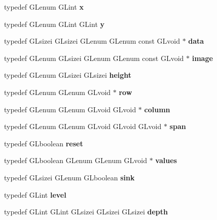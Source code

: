 \begin{DoxyCompactItemize}
\item 
typedef G\+Lenum G\+Lint {\bfseries x}\label{_s_d_l__opengl_8h_ae8f024308aaf3cca3d48055ebb11f6ec}

\item 
typedef G\+Lenum G\+Lint G\+Lint {\bfseries y}\label{_s_d_l__opengl_8h_a6b933de812613e6b69cf9a98aacc9916}

\item 
typedef G\+Lsizei G\+Lsizei G\+Lenum G\+Lenum const G\+Lvoid $\ast$ {\bfseries data}\label{_s_d_l__opengl_8h_a89ce72163394e6aef63b551a8806e93f}

\item 
typedef G\+Lenum G\+Lsizei G\+Lenum G\+Lenum const G\+Lvoid $\ast$ {\bfseries image}\label{_s_d_l__opengl_8h_a4f252db605f5b9117603096756e79824}

\item 
typedef G\+Lenum G\+Lsizei G\+Lsizei {\bfseries height}\label{_s_d_l__opengl_8h_aedd0ea77029b98ce91e47c19addcb68f}

\item 
typedef G\+Lenum G\+Lenum G\+Lvoid $\ast$ {\bfseries row}\label{_s_d_l__opengl_8h_a11b277b422822f784ee248b43eee3e1e}

\item 
typedef G\+Lenum G\+Lenum G\+Lvoid G\+Lvoid $\ast$ {\bfseries column}\label{_s_d_l__opengl_8h_a3b58c39b1b7ca6f4012b27e84de3bdb3}

\item 
typedef G\+Lenum G\+Lenum G\+Lvoid G\+Lvoid G\+Lvoid $\ast$ {\bfseries span}\label{_s_d_l__opengl_8h_a5c3e64bd109484c4d0b9ba6debe3e8ad}

\item 
typedef G\+Lboolean {\bfseries reset}\label{_s_d_l__opengl_8h_a11158672fb6a3f09183a338ecff59e41}

\item 
typedef G\+Lboolean G\+Lenum G\+Lenum G\+Lvoid $\ast$ {\bfseries values}\label{_s_d_l__opengl_8h_a300a8ed5fb9490aa35713406ec0412df}

\item 
typedef G\+Lsizei G\+Lenum G\+Lboolean {\bfseries sink}\label{_s_d_l__opengl_8h_a98256b3410c68877f51c14b2ad0591ab}

\item 
typedef G\+Lint {\bfseries level}\label{_s_d_l__opengl_8h_a2424d012241ecec8ab2763eddf543736}

\item 
typedef G\+Lint G\+Lint G\+Lsizei G\+Lsizei G\+Lsizei {\bfseries depth}\label{_s_d_l__opengl_8h_a1c814629538debe12a7bfe2509a3671e}


\end{DoxyCompactItemize}
